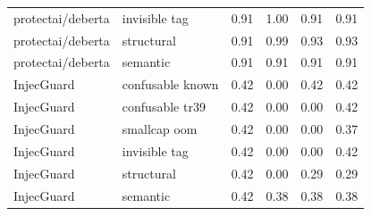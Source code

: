 \begin{table}[ht]
\begin{tabular}{ll cccc}
protectai/deberta & invisible tag & 0.91 & 1.00 & 0.91 & 0.91 \\
protectai/deberta & structural & 0.91 & 0.99 & 0.93 & 0.93 \\
protectai/deberta & semantic & 0.91 & 0.91 & 0.91 & 0.91 \\
InjecGuard & confusable known & 0.42 & 0.00 & 0.42 & 0.42 \\
InjecGuard & confusable tr39 & 0.42 & 0.00 & 0.00 & 0.42 \\
InjecGuard & smallcap oom & 0.42 & 0.00 & 0.00 & 0.37 \\
InjecGuard & invisible tag & 0.42 & 0.00 & 0.00 & 0.42 \\
InjecGuard & structural & 0.42 & 0.00 & 0.29 & 0.29 \\
InjecGuard & semantic & 0.42 & 0.38 & 0.38 & 0.38 \\
\bottomrule
\end{tabular}
\end{table}